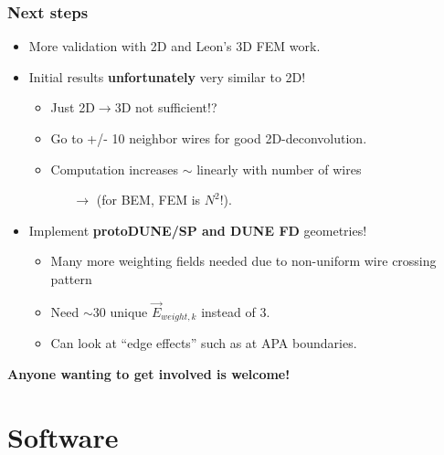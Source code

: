 \documentclass[xcolor=dvipsnames]{beamer}
\begin{document}
\begin{frame}
  \frametitle{Next steps}

  \begin{itemize}
  \item More validation with 2D and Leon's 3D FEM work.
  \item Initial results \textbf{unfortunately} very similar to 2D!
    \begin{itemize}
    \item Just 2D$\to$3D not sufficient!?
    \item Go to +/- 10 neighbor wires for good 2D-deconvolution.
    \item Computation increases $\sim$ linearly with number of wires 
      \begin{itemize}
      \item[$\rightarrow$] (for BEM, FEM is $N^2$!).
      \end{itemize}
    \end{itemize}
  \item Implement \textbf{protoDUNE/SP and DUNE FD} geometries!
    \begin{itemize}
    \item Many more weighting fields needed due to non-uniform wire crossing pattern
    \item Need $\sim$30 unique $\vec{E}_{weight,k}$ instead of 3.
    \item Can look at ``edge effects'' such as at APA boundaries.
    \end{itemize}
  \end{itemize}


  \vfill

  \textbf{Anyone wanting to get involved is welcome!}
\end{frame}

\section{Software}
\end{document}
